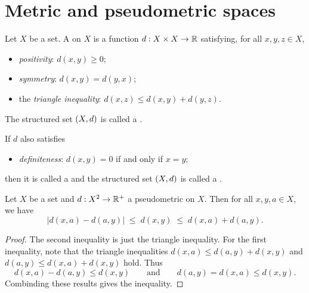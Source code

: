 \section{Metric and pseudometric spaces}
\begin{definition}
Let $X$ be a set. A  on $X$ is a function $d: X\times X\to \mathbb{R}$ satisfying, for all $x,y,z\in X$,
\begin{itemize}
\item \emph{positivity}: $d(x,y) \geq 0$;
\item \emph{symmetry}: $d(x,y) = d(y,x)$;
\item the \emph{triangle inequality}: $d(x,z) \leq d(x,y) + d(y,z)$.
\end{itemize}
The structured set $\left( X,d \right)$ is called a .

If $d$ also satisfies
\begin{itemize}
\item \emph{definiteness}: $d(x,y) = 0$ \textup{if and only if} $x=y$;
\end{itemize}
then it is called a  and the structured set $\left( X,d \right)$ is called a .
\end{definition}

\begin{lemma} \label{metricReverseTriangleInequality}
Let $X$ be a set and $d: X^2\to\mathbb{R}^+$ a pseudometric on $X$. Then for all $x,y,a\in X$, we have
\[ \big|d(x,a) - d(a,y)\big| \;\leq\; d(x,y) \;\leq\; d(x,a) + d(a,y). \]
\end{lemma}
\begin{proof}
The second inequality is just the triangle inequality. For the first inequality, note that the triangle inequalities $d(x,a) \leq d(a,y) + d(x,y)$ and $d(a,y)\leq d(x,a) + d(x,y)$ hold. Thus
\[ d(x,a) - d(a,y) \leq d(x,y) \qquad\text{and}\qquad d(a,y) = d(x,a) \leq d(x,y). \]
Combinding these results gives the inequality.
\end{proof}

